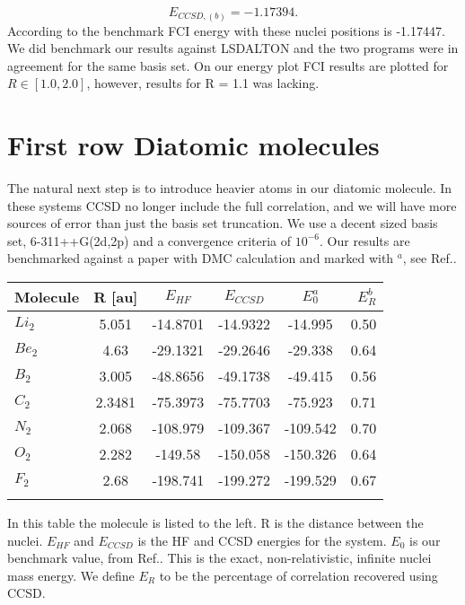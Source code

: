 \begin{equation}
E_{CCSD,(b)} = -1.17394.
\end{equation}
According to the benchmark FCI energy with these nuclei positions is -1.17447. \\

We did benchmark our results against LSDALTON and the two programs were in agreement for the same basis set. On our energy plot FCI results are plotted for $R \in [1.0, 2.0]$, however, results for R = 1.1 was lacking.

\section{First row Diatomic molecules}
The natural next step is to introduce heavier atoms in our diatomic molecule. In these systems CCSD no longer include the full correlation, and we will have more sources of error than just the basis set truncation. We use a decent sized basis set, 6-311++G(2d,2p) and a convergence criteria of $10^{-6}$. Our results are benchmarked against a paper with DMC calculation and marked with $^a$, see Ref.\cite{first_row_diatomic_referance_stuff}. \\

\begin{center}
\begin{tabular}{ l c  c c c r }
	\hline
  	Molecule & R [au] & $E_{HF}$ & $E_{CCSD}$ & 	$E_0^a$ & $E_R^b$ \\ \hline
  	$Li_2$ & 5.051 & -14.8701 & -14.9322 & -14.995 &  0.50 \\\hline
  	$Be_2$ & 4.63 & -29.1321 & -29.2646 & -29.338 &  0.64 \\ \hline
  	$B_2$ & 3.005 & -48.8656 & -49.1738 & -49.415 &  0.56 \\ \hline
  	$C_2$ & 2.3481 & -75.3973 & -75.7703 & -75.923 &  0.71 \\ \hline
  	$N_2$ & 2.068 & -108.979 & -109.367 & -109.542 & 0.70 \\ \hline
  	$O_2$ & 2.282 & -149.58 & -150.058 & -150.326 & 0.64  \\ \hline
  	$F_2$ & 2.68 & -198.741 & -199.272 & -199.529 & 0.67 \\ \hline
  	\\
	\end{tabular}
\end{center}

In this table the molecule is listed to the left. R is the distance between the nuclei. $E_{HF}$ and $E_{CCSD}$ is the HF and CCSD energies for the system. $E_0$ is our benchmark value, from Ref.\cite{first_row_diatomic_referance_stuff}. This is the exact, non-relativistic, infinite nuclei mass energy. We define $E_R$ to be the percentage of correlation recovered using CCSD.

